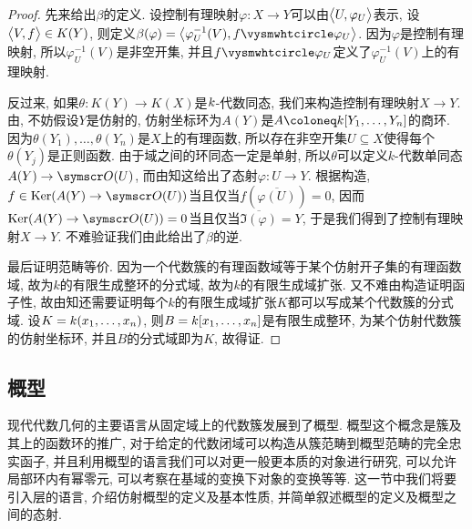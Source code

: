 \begin{proof}
  先来给出$\beta$的定义. 设控制有理映射$\varphi\colon X\to Y$可以由$\lrbig<>{U, \varphi_U}$表示, 设$\lrbig<>{V, f}\in K(Y)$, 则定义$\beta(\varphi)=\lrbig<>{\varphi_{U}^{-1}(V), f\composite \varphi_U}$. 因为$\varphi$是控制有理映射, 所以$\varphi_{U}^{-1}(V)$是非空开集, 并且$f\composite \varphi_U$定义了$\varphi_{U}^{-1}(V)$上的有理映射.

  反过来, 如果$\theta\colon K(Y)\to K(X)$是$\kk$-代数同态, 我们来构造控制有理映射$X\to Y$. 由, 不妨假设$Y$是仿射的, 仿射坐标环为$A(Y)$是$A\coloneq \kk [Y_1, \dotsc, Y_n]$的商环. 因为$\theta(Y_1), \dotsc, \theta(Y_n)$是$X$上的有理函数, 所以存在非空开集$U\subseteq X$使得每个$\theta(Y_j)$是正则函数. 由于域之间的环同态一定是单射, 所以$\theta$可以定义$k$-代数单同态$A(Y)\to \OO (U)$, 而由知这给出了态射$\varphi\colon U\to Y$. 根据构造, $f\in\Ker (A(Y)\to \OO (U))$当且仅当$f(\overline{\varphi (U)})=0$, 因而$\Ker (A(Y)\to \OO (U))=0$当且仅当$\overline{\Im (\varphi)}=Y$, 于是我们得到了控制有理映射$X\to Y$. 不难验证我们由此给出了$\beta$的逆.

  最后证明范畴等价. 因为一个代数簇的有理函数域等于某个仿射开子集的有理函数域, 故为$k$的有限生成整环的分式域, 故为$k$的有限生成域扩张. 又不难由构造证明函子性, 故由知还需要证明每个$k$的有限生成域扩张$K$都可以写成某个代数簇的分式域. 设$K=\kk (x_1, \dotsc, x_n)$, 则$B=\kk [x_1, \dotsc, x_n]$是有限生成整环, 为某个仿射代数簇的仿射坐标环, 并且$B$的分式域即为$K$, 故得证.
\end{proof}



\subsection{概型}\label{sec:ag-affinescheme}

现代代数几何的主要语言从固定域上的代数簇发展到了概型. 概型这个概念是簇及其上的函数环的推广, 对于给定的代数闭域可以构造从簇范畴到概型范畴的完全忠实函子, 并且利用概型的语言我们可以对更一般更本质的对象进行研究, 可以允许局部环内有幂零元, 可以考察在基域的变换下对象的变换等等. 这一节中我们将要引入层的语言, 介绍仿射概型的定义及基本性质, 并简单叙述概型的定义及概型之间的态射.

